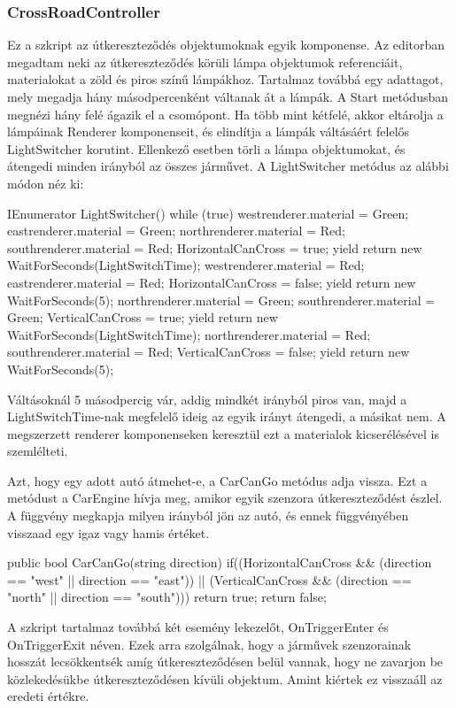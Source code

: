 \subsubsection{CrossRoadController}
Ez a szkript az útkereszteződés objektumoknak egyik komponense. Az editorban megadtam neki az útkereszteződés körüli lámpa objektumok referenciáit, materialokat a zöld és piros színű lámpákhoz. Tartalmaz továbbá egy adattagot, mely megadja hány másodpercenként váltanak át a lámpák.
A Start metódusban megnézi hány felé ágazik el a csomópont. Ha több mint kétfelé, akkor eltárolja a lámpáinak Renderer komponenseit, és elindítja a lámpák váltásáért felelős LightSwitcher korutint. Ellenkező esetben törli a lámpa objektumokat, és átengedi minden irányból az összes járművet.
A LightSwitcher metódus az alábbi módon néz ki:
\begin{cpp}
IEnumerator LightSwitcher()
    {
        while (true)
        {
            westrenderer.material = Green;
            eastrenderer.material = Green;
            northrenderer.material = Red;
            southrenderer.material = Red;
            HorizontalCanCross = true;
            yield return new WaitForSeconds(LightSwitchTime);
            westrenderer.material = Red;
            eastrenderer.material = Red;
            HorizontalCanCross = false;
            yield return new WaitForSeconds(5);
            northrenderer.material = Green;
            southrenderer.material = Green;
            VerticalCanCross = true;
            yield return new WaitForSeconds(LightSwitchTime);
            northrenderer.material = Red;
            southrenderer.material = Red;
            VerticalCanCross = false;
            yield return new WaitForSeconds(5);
        }
    }
\end{cpp}
Váltásoknál 5 másodpercig vár, addig mindkét irányból piros van, majd a LightSwitchTime-nak megfelelő ideig az egyik irányt átengedi, a másikat nem. A megszerzett renderer komponenseken keresztül ezt a materialok kicserélésével is szemlélteti.

Azt, hogy egy adott autó átmehet-e, a CarCanGo metódus adja vissza. Ezt a metódust a CarEngine hívja meg, amikor egyik szenzora útkereszteződést észlel. A függvény megkapja milyen irányból jön az autó, és ennek függvényében visszaad egy igaz vagy hamis értéket.
\begin{cpp}
public bool CarCanGo(string direction)
    {
        if((HorizontalCanCross && (direction == "west" 
        || direction == "east")) || (VerticalCanCross && 
        (direction == "north" || direction == "south")))
        {
            return true;
        }
        return false;
    }
\end{cpp}

A szkript tartalmaz továbbá két esemény lekezelőt, OnTriggerEnter és OnTriggerExit néven. Ezek arra szolgálnak, hogy a járművek szenzorainak hosszát lecsökkentsék amíg útkereszteződésen belül vannak, hogy ne zavarjon be közlekedésükbe útkereszteződésen kívüli objektum. Amint kiértek ez visszaáll az eredeti értékre.